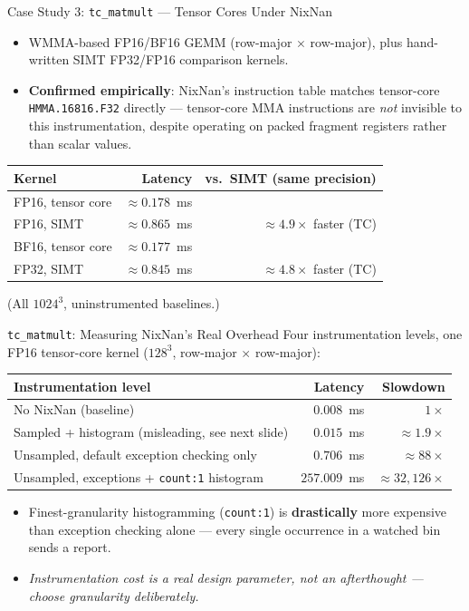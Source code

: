 \documentclass[aspectratio=169,11pt]{beamer}
\begin{document}
\begin{frame}{Case Study 3: \texttt{tc\_matmult} --- Tensor Cores Under NixNan}
\begin{itemize}
  \item WMMA-based FP16/BF16 GEMM (row-major $\times$ row-major), plus
    hand-written SIMT FP32/FP16 comparison kernels.
  \item \textbf{Confirmed empirically}: NixNan's instruction table matches
    tensor-core \texttt{HMMA.16816.F32} directly --- tensor-core MMA
    instructions are \emph{not} invisible to this instrumentation, despite
    operating on packed fragment registers rather than scalar values.
\end{itemize}
\begin{center}
\begin{tabular}{lrr}
\toprule
Kernel & Latency & vs.\ SIMT (same precision) \\
\midrule
FP16, tensor core & $\approx0.178$~ms & \\
FP16, SIMT & $\approx0.865$~ms & $\approx\!4.9\times$ faster (TC) \\
\midrule
BF16, tensor core & $\approx0.177$~ms & \\
FP32, SIMT & $\approx0.845$~ms & $\approx\!4.8\times$ faster (TC) \\
\bottomrule
\end{tabular}
\end{center}
(All $1024^3$, uninstrumented baselines.)
\end{frame}

\begin{frame}{\texttt{tc\_matmult}: Measuring NixNan's Real Overhead}
Four instrumentation levels, one FP16 tensor-core kernel ($128^3$, row-major
$\times$ row-major):
\begin{center}
\scriptsize
\begin{tabular}{lrr}
\toprule
Instrumentation level & Latency & Slowdown \\
\midrule
No NixNan (baseline) & $0.008$~ms & $1\times$ \\
Sampled + histogram (misleading, see next slide) & $0.015$~ms & $\approx\!1.9\times$ \\
Unsampled, default exception checking only & $0.706$~ms & $\approx\!88\times$ \\
Unsampled, exceptions + \texttt{count:1} histogram & $257.009$~ms & $\approx\!32{,}126\times$ \\
\bottomrule
\end{tabular}
\end{center}
\begin{itemize}
  \item Finest-granularity histogramming (\texttt{count:1}) is
    \textbf{drastically} more expensive than exception checking alone ---
    every single occurrence in a watched bin sends a report.
  \item \textit{Instrumentation cost is a real design parameter, not an
    afterthought --- choose granularity deliberately.}
\end{itemize}
\end{frame}
\end{document}
